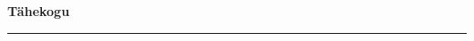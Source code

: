 \documentclass[10pt]{book}
\begin{document}
{
  \samepage
  \raggedbottom
  \raggedright
  \sloppy


  \vspace{0.2in}

  \noindent\begin{minipage}{.1\textwidth}
    \hfill\vspace{0.1in}
  \end{minipage}%
  \noindent\begin{minipage}{.8\textwidth}
    \centering
    \bfseries
    \large T\"ahekogu
  \end{minipage}%
  \noindent\begin{minipage}{.1\textwidth}
      \hfill\vspace{0.1in}
  \end{minipage}

  \nopagebreak[4]
  \vspace{0.1in}
  \nopagebreak[4]
  \hrule height 0.05ex
  \nopagebreak[4]
  \vspace{-0.05in}




}
\end{document}
